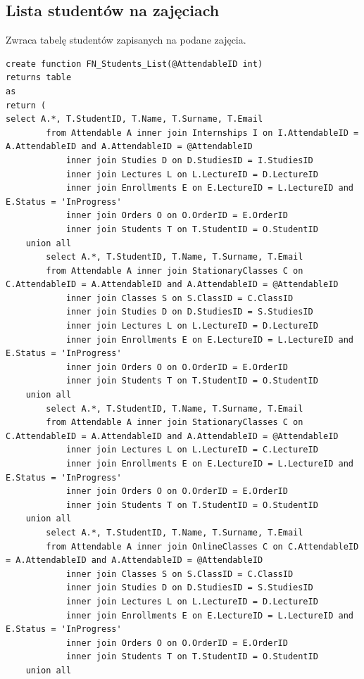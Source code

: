 \documentclass[11pt,a4paper]{article}
\begin{document}
\subsection{Lista studentów na zajęciach}
Zwraca tabelę studentów zapisanych na podane zajęcia.
\begin{Verbatim}[breaklines=true]
create function FN_Students_List(@AttendableID int)
returns table
as
return (
select A.*, T.StudentID, T.Name, T.Surname, T.Email
        from Attendable A inner join Internships I on I.AttendableID = A.AttendableID and A.AttendableID = @AttendableID
            inner join Studies D on D.StudiesID = I.StudiesID
            inner join Lectures L on L.LectureID = D.LectureID
            inner join Enrollments E on E.LectureID = L.LectureID and E.Status = 'InProgress'
            inner join Orders O on O.OrderID = E.OrderID
            inner join Students T on T.StudentID = O.StudentID
    union all
        select A.*, T.StudentID, T.Name, T.Surname, T.Email
        from Attendable A inner join StationaryClasses C on C.AttendableID = A.AttendableID and A.AttendableID = @AttendableID
            inner join Classes S on S.ClassID = C.ClassID
            inner join Studies D on D.StudiesID = S.StudiesID
            inner join Lectures L on L.LectureID = D.LectureID
            inner join Enrollments E on E.LectureID = L.LectureID and E.Status = 'InProgress'
            inner join Orders O on O.OrderID = E.OrderID
            inner join Students T on T.StudentID = O.StudentID
    union all
        select A.*, T.StudentID, T.Name, T.Surname, T.Email
        from Attendable A inner join StationaryClasses C on C.AttendableID = A.AttendableID and A.AttendableID = @AttendableID
            inner join Lectures L on L.LectureID = C.LectureID
            inner join Enrollments E on E.LectureID = L.LectureID and E.Status = 'InProgress'
            inner join Orders O on O.OrderID = E.OrderID
            inner join Students T on T.StudentID = O.StudentID
    union all
        select A.*, T.StudentID, T.Name, T.Surname, T.Email
        from Attendable A inner join OnlineClasses C on C.AttendableID = A.AttendableID and A.AttendableID = @AttendableID
            inner join Classes S on S.ClassID = C.ClassID
            inner join Studies D on D.StudiesID = S.StudiesID
            inner join Lectures L on L.LectureID = D.LectureID
            inner join Enrollments E on E.LectureID = L.LectureID and E.Status = 'InProgress'
            inner join Orders O on O.OrderID = E.OrderID
            inner join Students T on T.StudentID = O.StudentID
    union all

\end{Verbatim}
\end{document}

